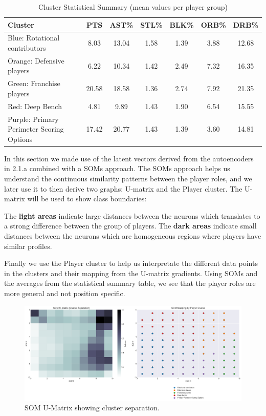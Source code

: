 \documentclass{article}
\begin{document}
\begin{table}[h!]
\centering
\caption{Cluster Statistical Summary (mean values per player group)}
\label{tab:cluster_stats}
\begin{tabular}{lcccccc}
\toprule
\textbf{Cluster} & \textbf{PTS} & \textbf{AST\%} & \textbf{STL\%} & \textbf{BLK\%} & \textbf{ORB\%} & \textbf{DRB\%} \\
\midrule
Blue: Rotational contributors & 8.03 & 13.04 & 1.58 & 1.39 & 3.88 &	12.68 \\
Orange: Defensive players & 6.22 & 10.34 & 1.42 & 2.49 & 7.32 & 16.35 \\
Green: Franchise players & 20.58 & 18.58 & 1.36 & 2.74 & 7.92 & 21.35 \\
Red: Deep Bench & 4.81	& 9.89 &	1.43 &	1.90 &	6.54 &	15.55 \\
Purple: Primary Perimeter Scoring Options & 17.42	&20.77 &	1.43 &	1.39	& 3.60	& 14.81 \\
\bottomrule
\end{tabular}
\end{table}

In this section we made use of the latent vectors derived from the autoencoders in 2.1.a combined with a SOMs approach.
The SOMs approach helps us understand the continuous similarity patterns between the player roles, and we later use it to then derive two graphs: U-matrix and the Player cluster. The U-matrix will be used to show class boundaries:

The {\bf light areas} indicate large distances between the neurons which translates to a strong difference between the group of players.
The {\bf dark areas} indicate small distances between the neurons which are homogeneous regions where players have similar profiles.

Finally we use the Player cluster to help us interpretate the different data points in the clusters and their mapping from the U-matrix gradients. Using SOMs and the averages from the statistical summary table, we see that the player roles are more general and not position specific.

\begin{figure}[h]
    \centering
    \includegraphics[width=0.7\linewidth]{media/2b.png}
    \caption{SOM U-Matrix showing cluster separation.}
\end{figure}
\end{document}
